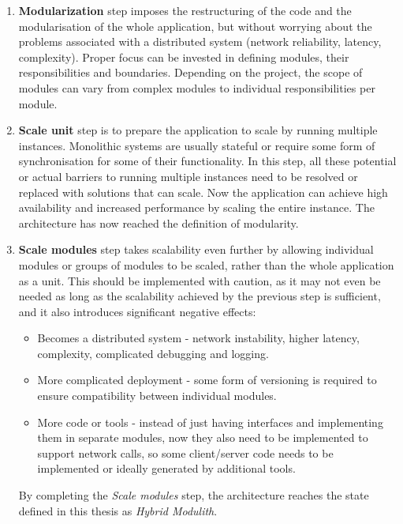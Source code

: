 \begin{enumerate}
    \item \textbf{Modularization} step imposes the restructuring of the code and the modularisation of the whole application, but without worrying about the problems associated with a distributed system (network reliability, latency, complexity). Proper focus can be invested in defining modules, their responsibilities and boundaries. Depending on the project, the scope of modules can vary from complex modules to individual responsibilities per module.
    \item \textbf{Scale unit} step is to prepare the application to scale by running multiple instances. Monolithic systems are usually stateful or require some form of synchronisation for some of their functionality. In this step, all these potential or actual barriers to running multiple instances need to be resolved or replaced with solutions that can scale. Now the application can achieve high availability and increased performance by scaling the entire instance. The architecture has now reached the definition of modularity.
    \item \textbf{Scale modules} step takes scalability even further by allowing individual modules or groups of modules to be scaled, rather than the whole application as a unit. This should be implemented with caution, as it may not even be needed as long as the scalability achieved by the previous step is sufficient, and it also introduces significant negative effects:
          \begin{itemize}
              \item Becomes a distributed system - network instability, higher latency, complexity, complicated debugging and logging.
              \item More complicated deployment - some form of versioning is required to ensure compatibility between individual modules.
              \item More code or tools - instead of just having interfaces and implementing them in separate modules, now they also need to be implemented to support network calls, so some client/server code needs to be implemented or ideally generated by additional tools.
          \end{itemize}
          By completing the \textit{Scale modules} step, the architecture reaches the state defined in this thesis as \textit{Hybrid Modulith}.
\end{enumerate}

